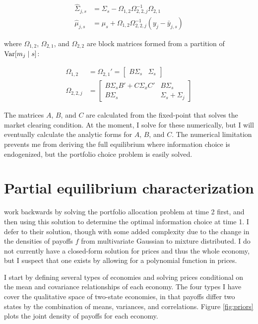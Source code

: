 \documentclass{article}
\begin{document}
\begin{align*}
    \hat \Sigma_{j,s} &= \Sigma_s - \Omega_{1,2} \Omega_{2,2,j}^{-1} \Omega_{2,1} \\ 
    \hat \mu_{j,s} &= \mu_s + \Omega_{1,2} \Omega_{2,2,j}^{-1} (y_j - \bar y_{j,s})
\end{align*}

\noindent where $\Omega_{1,2}$, $\Omega_{2,1}$, and $\Omega_{2,2}$ are block matrices formed from a partition of $\text{Var}[m_j \mid s]$:

\begin{align*}
    \Omega_{1,2} &= \Omega_{2,1}' = \begin{bmatrix}
        B \Sigma_s & \Sigma_s
    \end{bmatrix} \\
    \Omega_{2,2,j} &= \begin{bmatrix}
        B\Sigma_s B' + C \Sigma_x C' & B \Sigma_s \\
        B \Sigma_s & \Sigma_s + \Sigma_j
    \end{bmatrix}
\end{align*}

\noindent The matrices $A$, $B$, and $C$ are calculated from the fixed-point that solves the market clearing condition. At the moment, I solve for these numerically, but I will eventually calculate the analytic forms for $A$, $B$, and $C$. The numerical limitation prevents me from deriving the full equilibrium where information choice is endogenized, but the portfolio choice problem is easily solved.

\section{Partial equilibrium characterization}\label{sec:peq}

\textcite{kacperczyk_rational_2016} work backwards by solving the portfolio allocation problem at time 2 first, and then using this solution to determine the optimal information choice at time 1. I defer to their solution, though with some added complexity due to the change in the densities of payoffs $f$ from multivariate Gaussian to mixture distributed. I do not currently have a closed-form solution for prices and thus the whole economy, but I suspect that one exists by allowing for a polynomial function in prices.

I start by defining several types of economies and solving prices conditional on the mean and covariance relationships of each economy. The four types I have cover the qualitative space of two-state economies, in that payoffs differ two states by the combination of means, variances, and correlations. Figure \ref{fig:priors} plots the joint density of payoffs for each economy.
\end{document}

